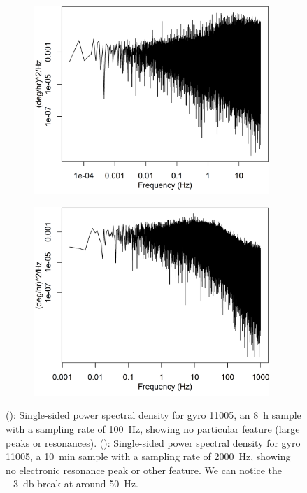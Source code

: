 \begin{figure}[!ht]
\begin{subfigure}[b]{0.5\textwidth}

		\centering
		\includegraphics[width=0.98\textwidth]{Figures/sspwsd_11005.png} 
		\caption{}
		\label{subfig:sspsd11005}
\end{subfigure}
\begin{subfigure}[b]{0.5\textwidth}
		\centering
		\includegraphics[width=0.98\textwidth]{Figures/sspwsd2000_11005.png} 
		\caption{}
		\label{subfig:sspsd2000-11005}
\end{subfigure}
\label{fig:gyrospectra}
\caption[Power spectral density]{(): Single-sided power spectral density for gyro 11005, an \SI{8}{\hour} sample with a sampling rate of \SI{100}{\hertz}, showing no particular feature (large peaks or resonances). (): Single-sided power spectral density for gyro 11005, a \SI{10}{\minute} sample with a sampling rate of \SI{2000}{\hertz}, showing no electronic resonance peak or other feature. We can notice the \SI{-3}{\decibel} break at around \SI{50}{\hertz}.}
\end{figure}

